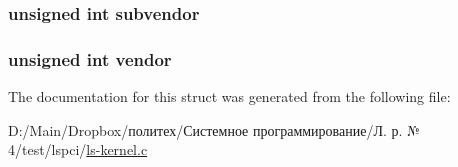 \subsubsection[{\texorpdfstring{subvendor}{subvendor}}]{\setlength{\rightskip}{0pt plus 5cm}unsigned int subvendor}\hypertarget{structpcimap__entry_a1ace61feb68d4a8aadeebd89639b6a69}{}\label{structpcimap__entry_a1ace61feb68d4a8aadeebd89639b6a69}
\subsubsection[{\texorpdfstring{vendor}{vendor}}]{\setlength{\rightskip}{0pt plus 5cm}unsigned int vendor}\hypertarget{structpcimap__entry_acc66c4a1f4c07624a40017edb0ad147f}{}\label{structpcimap__entry_acc66c4a1f4c07624a40017edb0ad147f}


The documentation for this struct was generated from the following file\+:\begin{DoxyCompactItemize}
\item 
D\+:/\+Main/\+Dropbox/политех/Системное программирование/Л. р. № 4/test/lspci/\hyperlink{ls-kernel_8c}{ls-\/kernel.\+c}\end{DoxyCompactItemize}
